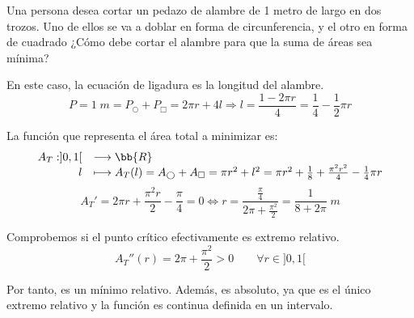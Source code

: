 \begin{ejercicio}
    Una persona desea cortar un pedazo de alambre de 1 metro de largo en dos trozos. Uno de ellos se va a doblar en forma de circunferencia, y el otro en forma de cuadrado ¿Cómo debe cortar el alambre para que la suma de áreas sea mínima?
    \begin{figure}[H]
        \centering
    \end{figure}

    En este caso, la ecuación de ligadura es la longitud del alambre.
    \begin{equation*}
        P=1\;m = P_{\bigcirc} + P_{\Box} = 2\pi r + 4l \Longrightarrow l=\frac{1-2\pi r}{4} = \frac{1}{4} - \frac{1}{2}\pi r
    \end{equation*}

    La función que representa el área total a minimizar es:
    \begin{equation*}
        \begin{array}{rl}
            A_T:]0,1[ & \longrightarrow \bb{R}\\
                    l & \longmapsto A_T(l)= A_{\bigcirc} + A_{\Box} = \pi r^2 + l^2 = \pi r^2 + \frac{1}{8} + \frac{\pi ^2 r^2}{4} - \frac{1}{4}\pi r
        \end{array}
    \end{equation*}
    \begin{equation*}
        A_T' = 2\pi r + \frac{\pi ^2 r}{2} - \frac{\pi}{4} = 0 \Longleftrightarrow r=\frac{\frac{\pi}{4}}{2\pi + \frac{\pi^2}{2}} = \frac{1}{8 + 2\pi}\; m
    \end{equation*}

    Comprobemos si el punto crítico efectivamente es extremo relativo.
    \begin{equation*}
        A_T''(r) = 2\pi + \frac{\pi^2}{2} > 0\qquad  \forall r \in ]0,1[
    \end{equation*}

    Por tanto, es un mínimo relativo. Además, es absoluto, ya que es el único extremo relativo y la función es continua definida en un intervalo.


\end{ejercicio}
